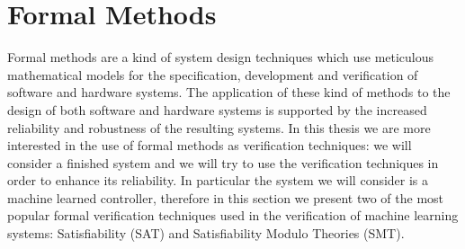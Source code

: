 \section{Formal Methods}\label{sec:decproc}
Formal methods are a kind of system design techniques which use meticulous mathematical models for the specification, development and verification of software and hardware systems. The application of these kind of methods to the design of both software and hardware systems is supported by the increased reliability and robustness of the resulting systems. In this thesis we are more interested in the use of formal methods as verification techniques: we will consider a finished system and we will try to use the verification techniques in order to enhance its reliability.
In particular the system we will consider is a machine learned controller, therefore in this section we present two of the most popular formal verification techniques used in the verification of machine learning systems: Satisfiability (SAT) and Satisfiability Modulo Theories (SMT).
